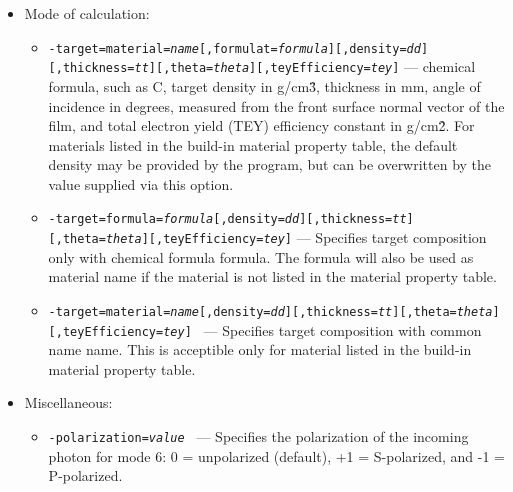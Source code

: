 \begin{itemize}
\begin{itemize}
\begin{itemize}
            \item {\tt -mode=11} ---
              Retrieve atomic scattering factor of the target element. The output contains coulmns of photon energy (PhotonEnergy) in eV, and real and imaginary part of the scattering factor (F1, F2). 
             \item {\tt -mode=20} ---
               Retrieve Kissel partial photoelectric cross sections of the target element. The output contains coulmns of photon energy (PhotonEnergy) in eV, photo-absorption cross sections (PhotoCS), coherent scattering cross sections (CoherentCS), incoherent scattering cross sections (IncoherentCS) and total photo cross sections (TotalCS) in cm\^{2}/g.  
          \end{itemize}
     \item Mode of calculation: 
        \begin{itemize}
          \item {\tt -target=material={\em name}[,formulat={\em formula}][,density={\em dd}][,thickness={\em tt}][,theta={\em theta}][,teyEfficiency={\em tey}]} ---
            chemical formula, such as C, target density in g/cm\^{3}, thickness in mm, angle of incidence in degrees, measured from the front surface normal vector of the film, and total electron yield (TEY) efficiency constant in g/cm\^{2}. For materials listed in the build-in material property table, the default density may be provided by the program, but can be overwritten by the value supplied via this option. 
          \item {\tt -target=formula={\em formula}[,density={\em dd}][,thickness={\em tt}][,theta={\em theta}][,teyEfficiency={\em tey}]} ---
            Specifies target composition only with chemical formula formula. The formula will also be used as material name if the material is not listed in the material property table. 
          \item {\tt -target=material={\em name}[,density={\em dd}][,thickness={\em tt}][,theta={\em theta}][,teyEfficiency={\em tey}] } ---
            Specifies target composition with common name name. This is acceptible only for material listed in the build-in material property table. 
        \end{itemize}
    \item {Miscellaneous:}
        \begin{itemize}
          \item {\tt -polarization={\em value} } ---
            Specifies the polarization of the incoming photon for mode 6: 0 = unpolarized (default), +1 = S-polarized, and -1 = P-polarized. 

\end{itemize}
\end{itemize}
\end{itemize}

